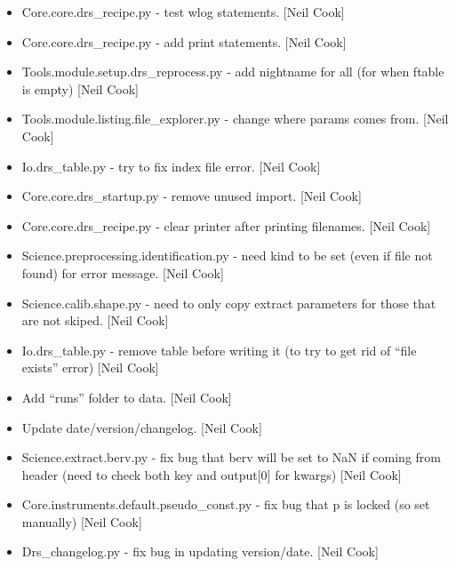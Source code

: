 \documentclass[a4paper,10pt,english]{report}
\begin{document}
\begin{itemize}
\item {} 
Core.core.drs\_recipe.py - test wlog statements. {[}Neil Cook{]}

\item {} 
Core.core.drs\_recipe.py - add print statements. {[}Neil Cook{]}

\item {} 
Tools.module.setup.drs\_reprocess.py - add nightname for all (for when
ftable is empty) {[}Neil Cook{]}

\item {} 
Tools.module.listing.file\_explorer.py - change where params comes
from. {[}Neil Cook{]}

\item {} 
Io.drs\_table.py - try to fix index file error. {[}Neil Cook{]}

\item {} 
Core.core.drs\_startup.py - remove unused import. {[}Neil Cook{]}

\item {} 
Core.core.drs\_recipe.py - clear printer after printing filenames.
{[}Neil Cook{]}

\item {} 
Science.preprocessing.identification.py - need kind to be set (even if
file not found) for error message. {[}Neil Cook{]}

\item {} 
Science.calib.shape.py - need to only copy extract parameters for
those that are not skiped. {[}Neil Cook{]}

\item {} 
Io.drs\_table.py - remove table before writing it (to try to get rid of
“file exists” error) {[}Neil Cook{]}

\item {} 
Add “runs” folder to data. {[}Neil Cook{]}

\item {} 
Update date/version/changelog. {[}Neil Cook{]}

\item {} 
Science.extract.berv.py - fix bug that berv will be set to NaN if
coming from header (need to check both key and output{[}0{]} for kwargs)
{[}Neil Cook{]}

\item {} 
Core.instruments.default.pseudo\_const.py - fix bug that p is locked
(so set manually) {[}Neil Cook{]}

\item {} 
Drs\_changelog.py - fix bug in updating version/date. {[}Neil Cook{]}

\end{itemize}
\end{document}
